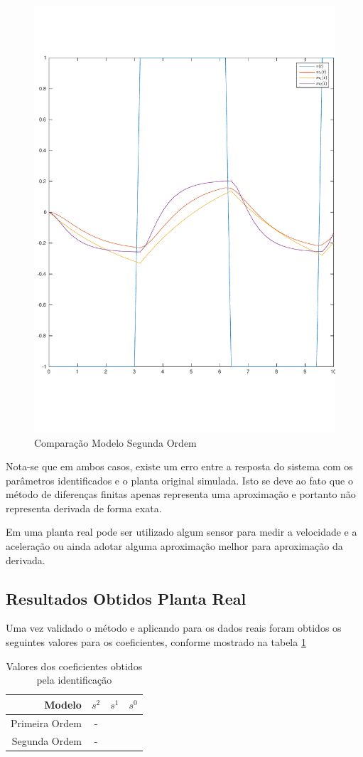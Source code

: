 \documentclass[a4paper,11pt]{article}
\begin{document}
\begin{figure}[H]
    \centering
    \includegraphics[width=0.6\linewidth]{tex/img/model2Evaluation.pdf}
    \caption{Comparação Modelo Segunda Ordem}
    \label{fig:model2Evaluation}
\end{figure}

Nota-se que em ambos casos, existe um erro entre a resposta do sistema com os parâmetros identificados e o planta original simulada. Isto se deve ao fato que o método de diferenças finitas apenas representa uma aproximação e portanto não representa derivada de forma exata.

Em uma planta real pode ser utilizado algum sensor para medir a velocidade e a aceleração ou ainda adotar alguma aproximação melhor para aproximação da derivada.



\subsection{Resultados Obtidos Planta Real}

Uma vez validado o método e aplicando para os dados reais foram obtidos os seguintes valores para os coeficientes, conforme mostrado na tabela \ref{tab:tf}

\begin{table}[H]
    \centering
    \begin{tabular}{r|ccc}
    \hline
        Modelo & $s^2$ & $s^1$ & $s^0$ \\
     \hline
        Primeira Ordem & - & & \\
        Segunda Ordem & - & & \\
     \hline
    \end{tabular}
    \caption{Valores dos coeficientes obtidos pela identificação}
    \label{tab:tf}
\end{table}
\end{document}
